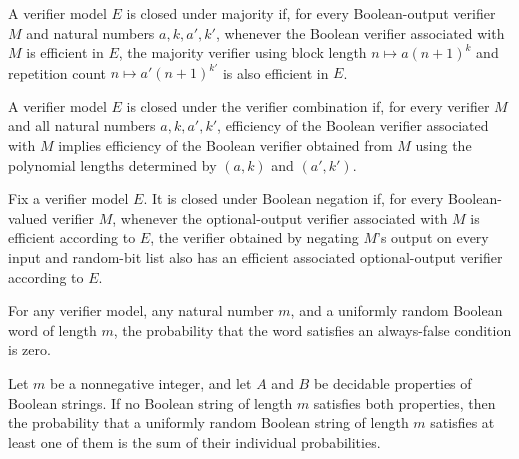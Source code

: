 \begin{definition}
\label{Randomized.ClosedUnderMajority}
\leanok
{}
A verifier model $E$ is closed under majority if, for every Boolean-output verifier $M$
and natural numbers $a,k,a',k'$, whenever the Boolean verifier associated with $M$ is
efficient in $E$, the majority verifier using block length $n\mapsto a(n+1)^k$ and
repetition count $n\mapsto a'(n+1)^{k'}$ is also efficient in $E$.
\end{definition}

\begin{definition}
\label{Randomized.ClosedUnderAny}
\leanok
{}
A verifier model $E$ is closed under the verifier combination if, for every verifier $M$
and all natural numbers $a,k,a',k'$, efficiency of the Boolean verifier associated with
$M$ implies efficiency of the Boolean verifier obtained from $M$ using the polynomial
lengths determined by $(a,k)$ and $(a',k')$.
\end{definition}

\begin{definition}
\label{Randomized.ClosedUnderNot}
\leanok
{}
Fix a verifier model $E$. It is closed under Boolean negation if, for every
Boolean-valued verifier $M$, whenever the optional-output verifier associated with $M$
is efficient according to $E$, the verifier obtained by negating $M$'s output on every
input and random-bit list also has an efficient associated optional-output verifier
according to $E$.
\end{definition}

\begin{theorem}
\label{Randomized.randProb_false}
\leanok
{}
For any verifier model, any natural number $m$, and a uniformly random Boolean word of
length $m$, the probability that the word satisfies an always-false condition is zero.
\end{theorem}

\begin{theorem}
\label{Randomized.randProb_or_disjoint}
\leanok
{}
Let $m$ be a nonnegative integer, and let $A$ and $B$ be decidable properties of Boolean
strings. If no Boolean string of length $m$ satisfies both properties, then the
probability that a uniformly random Boolean string of length $m$ satisfies at least one
of them is the sum of their individual probabilities.
\end{theorem}

